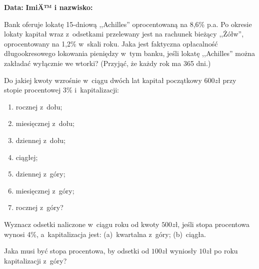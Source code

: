 \documentclass[addpoints]{exam}
\begin{document}
\raggedleft \textbf {Data:\enspace\makebox[2in]{\hrulefill}} 
\hfill  \textbf{ImiÄ™ i nazwisko: \enspace\makebox[2in]{\hrulefill}}
	
\vspace{0.1in}

	\begin{questions}

  \question
    Bank oferuje lokatę 15-dniową ,,Achilles'' oprocentowaną na 8,6\%
    p.a.  Po okresie lokaty kapitał wraz z~odsetkami przelewany jest
    na rachunek bieżący ,,Żółw'', oprocentowany na 1,2\% w~skali
    roku.  Jaka jest faktyczna opłacalność długookresowego lokowania
    pieniędzy w~tym banku, jeśli lokatę ,,Achilles'' można zakładać
    wyłącznie we wtorki?  (Przyjąć, że każdy rok ma 365 dni.)

  \question
    Do jakiej kwoty wzrośnie w~ciągu dwóch lat kapitał początkowy $600zł$ przy
    stopie procentowej 3\% i~kapitalizacji:
    \begin{enumerate}
    \item rocznej z~dołu;
    \item miesięcznej z~dołu;
    \item dziennej z~dołu;
    \item ciągłej;
    \item dziennej z~góry;
    \item miesięcznej z~góry;
    \item rocznej z~góry?
    \end{enumerate}

  \question
    Wyznacz odsetki naliczone w~ciągu roku od kwoty $500zł$, jeśli stopa
    procentowa wynosi 4\%, a~kapitalizacja jest: (a)~kwartalna z~góry;
    (b)~ciągła.

  \question
    Jaka musi być stopa procentowa, by odsetki od $100zł$ wyniosły $10zł$ po
    roku kapitalizacji z~góry?



	\end{questions}
\end{document}
